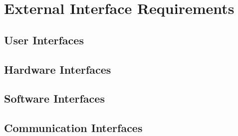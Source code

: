 \documentclass[11pt,a4paper]{report}
\begin{document}
\section{External Interface Requirements}
\subsection{User Interfaces}
\subsection{Hardware Interfaces}
\subsection{Software Interfaces}
\subsection{Communication Interfaces}
\end{document}

